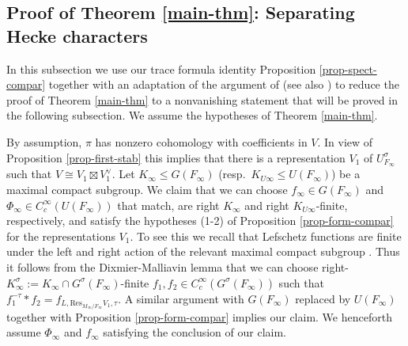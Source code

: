 \documentclass[12pt]{amsart}
\theoremstyle{remark}
\numberwithin{equation}{section}
\theoremstyle{definition}
\numberwithin{equation}{subsection}
\begin{document}
\subsection{Proof of Theorem \ref{main-thm}: Separating Hecke characters}
\label{ssec-part1}
In this subsection we use our trace formula identity Proposition \ref{prop-spect-compar} together with an adaptation of the argument of
\cite[\S 3]{JacquetLai} (see also \cite[\S 13]{Hakim})
to reduce the proof of Theorem \ref{main-thm} to a nonvanishing statement that will be proved in the following subsection.
We assume the hypotheses of Theorem \ref{main-thm}.

 By assumption, $\pi$ has nonzero cohomology with coefficients in $V$.  In view of
Proposition \ref{prop-first-stab} this implies that there is a representation $V_1$ of $U^{\sigma}_{F_{\infty}}$ such that $V  \cong V_1 \boxtimes V_1^{\vee}$.
Let $K_{\infty} \leq G(F_{\infty})$ (resp.~$K_{U\infty} \leq U(F_{\infty})$) be a maximal compact subgroup.  We claim that we can choose $f_{\infty} \in G(F_{\infty})$ and $\Phi_{\infty} \in C_c^{\infty}(U(F_{\infty}))$ that match, are right $K_{\infty}$ and right $K_{U\infty}$-finite, respectively, and satisfy the hypotheses (1-2) of Proposition \ref{prop-form-compar} for the representations $V_1$.  To see this we recall that Lefschetz functions are finite under the left and right action of the relevant maximal compact subgroup \cite[Proposition 8.4]{BLS}.  
Thus it follows from the Dixmier-Malliavin lemma \cite{DM} that we can choose right-$K^{\sigma}_{\infty}:=K_{\infty} \cap G^{\sigma}(F_{\infty})$-finite $f_1,f_2\in C_c^{\infty}(G^{\sigma}(F_{\infty}))$ such that $f_1^{-\tau}*f_2=f_{L,\mathrm{Res}_{M_{\infty}/F_{\infty}}V_1,\tau}$.  A similar argument with $G(F_{\infty})$ replaced by $U(F_{\infty})$ together with Proposition \ref{prop-form-compar} implies our claim.
We henceforth assume $\Phi_{\infty}$ and $f_{\infty}$ satisfying the conclusion of our claim.
\end{document}
